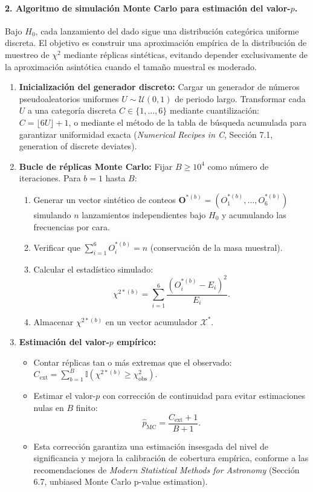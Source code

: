 \documentclass[12pt]{article}
\begin{document}
\paragraph{2. Algoritmo de simulación Monte Carlo para estimación del valor-$p$.}
Bajo $H_0$, cada lanzamiento del dado sigue una distribución categórica uniforme discreta. El objetivo es construir una aproximación empírica de la distribución de muestreo de $\chi^2$ mediante réplicas sintéticas, evitando depender exclusivamente de la aproximación asintótica cuando el tamaño muestral es moderado.
\begin{enumerate}
    \item \textbf{Inicialización del generador discreto:} Cargar un generador de números pseudoaleatorios uniformes $U \sim \mathcal{U}(0,1)$ de periodo largo. Transformar cada $U$ a una categoría discreta $C \in \{1, \dots, 6\}$ mediante cuantilización: $C = \lfloor 6U \rfloor + 1$, o mediante el método de la tabla de búsqueda acumulada para garantizar uniformidad exacta (\textit{Numerical Recipes in C}, Sección 7.1, generation of discrete deviates).
    \item \textbf{Bucle de réplicas Monte Carlo:} Fijar $B \geq 10^4$ como número de iteraciones. Para $b = 1$ hasta $B$:
    \begin{enumerate}
        \item Generar un vector sintético de conteos $\mathbf{O}^{*(b)} = (O_1^{*(b)}, \dots, O_6^{*(b)})$ simulando $n$ lanzamientos independientes bajo $H_0$ y acumulando las frecuencias por cara.
        \item Verificar que $\sum_{i=1}^6 O_i^{*(b)} = n$ (conservación de la masa muestral).
        \item Calcular el estadístico simulado: 
        $$
        \chi^{2*(b)} = \sum_{i=1}^6 \frac{(O_i^{*(b)} - E_i)^2}{E_i}.
        $$
        \item Almacenar $\chi^{2*(b)}$ en un vector acumulador $\mathcal{X}^*$.
    \end{enumerate}
    \item \textbf{Estimación del valor-$p$ empírico:} 
    \begin{itemize}
        \item Contar réplicas tan o más extremas que el observado: $C_{\text{ext}} = \sum_{b=1}^B \mathbb{I}(\chi^{2*(b)} \geq \chi^2_{\text{obs}})$.
        \item Estimar el valor-$p$ con corrección de continuidad para evitar estimaciones nulas en $B$ finito: 
        $$
        \hat{p}_{\text{MC}} = \frac{C_{\text{ext}} + 1}{B + 1}.
        $$
        \item Esta corrección garantiza una estimación insesgada del nivel de significancia y mejora la calibración de cobertura empírica, conforme a las recomendaciones de \textit{Modern Statistical Methods for Astronomy} (Sección 6.7, unbiased Monte Carlo p-value estimation).
    \end{itemize}
\end{enumerate}
\end{document}
